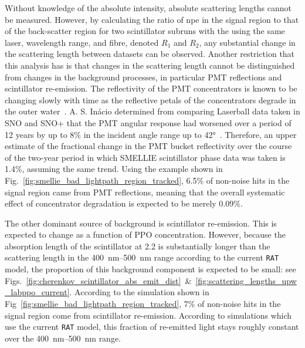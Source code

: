 Without knowledge of the absolute intensity, absolute scattering lengths cannot be measured. However, by calculating the ratio of npe in the signal region to that of the back-scatter region for two scintillator subruns with the using the same laser, wavelength range, and fibre, denoted $R_{1}$ and $R_{2}$, any substantial change in the scattering length between datasets can be observed. Another restriction that this analysis has is that changes in the scattering length cannot be distinguished from changes in the background processes, in particular PMT reflections and scintillator re-emission. The reflectivity of the PMT concentrators is known to be changing slowly with time as the reflective petals of the concentrators degrade in the outer water~\cite{andersonOpticalCalibrationSNO2021}. %
A. S. In\'{a}cio determined from comparing Laserball data taken in SNO and SNO+ that the PMT angular response had worsened over a period of 12 years by up to 8\% in the incident angle range up to \ang{42}~\cite{inacioDataAnalysisWater2022}. Therefore, an upper estimate of the fractional change in the PMT bucket reflectivity over the course of the two-year period in which SMELLIE scintillator phase data was taken is 1.4\%, assuming the same trend. Using the example shown in Fig.~\ref{fig:smellie_bad_lightpath_region_tracked}, 6.5\% of non-noise hits in the signal region came from PMT reflections, meaning that the overall systematic effect of concentrator degradation is expected to be merely 0.09\%.
 
The other dominant source of background is scintillator re-emission. This is expected to change as a function of PPO concentration. However, because the absorption length of the scintillator at \SI{2.2}{\gpl} is substantially longer than the scattering length in the \SIrange{400}{500}{\nm} range according to the current \texttt{RAT} model, the proportion of this background component is expected to be small: see Figs.~\ref{fig:cherenkov_scintillator_abs_emit_dist}~\&~\ref{fig:scattering_lengths_upw_labppo_current}. According to the simulation shown in Fig~\ref{fig:smellie_bad_lightpath_region_tracked}, 7\% of non-noise hits in the signal region come from scintillator re-emission. According to simulations which use the current \texttt{RAT} model, this fraction of re-emitted light stays roughly constant over the \SIrange{400}{500}{\nm} range.

